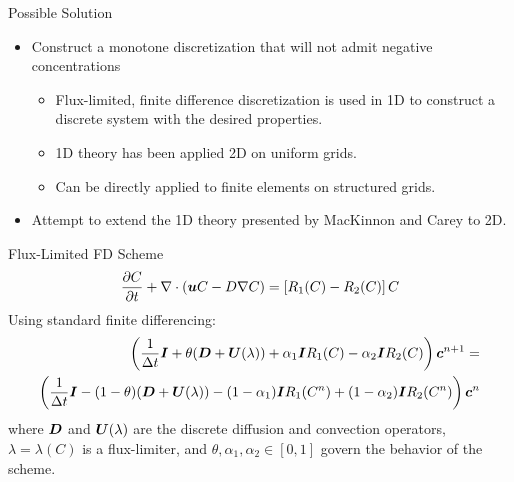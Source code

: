 \documentclass[landscape,pdftex,headrule,footrule]{foils}
\begin{document}
 
 
\begin{foil}{Possible Solution}
  \begin{itemize}
    \item Construct a monotone discretization that will not admit negative concentrations
      \begin{itemize}
        \item Flux-limited, finite difference discretization is used in 1D to
              construct a discrete system with the desired properties.
        \item 1D theory has been applied 2D on uniform grids.
        \item Can be directly applied to finite elements on
              structured grids.
      \end{itemize}
    \item Attempt to extend the 1D theory presented by MacKinnon and Carey to 2D.
  \end{itemize}
\end{foil}

                                                                                
                                                                                
\begin{foil}{Flux-Limited FD Scheme}
  \begin{equation}
    \frac{\partial C}{\partial t} + \nabla \cdot (\mbox{\boldmath $u$} C - D \nabla C)  = \left[R_1(C) - R_2(C)\right] C
    \nonumber
  \end{equation}
  Using standard finite differencing:
  \begin{eqnarray}
    \nonumber
    \left(\frac{1}{\Delta t}\mbox{\boldmath $I$} + \theta (\mbox{\boldmath $D$} + \mbox{\boldmath $U$}(\lambda)) + \alpha_1 \mbox{\boldmath $I$} R_1(C) - \alpha_2 \mbox{\boldmath $I$} R_2(C) \right) \mbox{\boldmath $c$}^{n+1} = \\ \nonumber
    \left(\frac{1}{\Delta t}\mbox{\boldmath $I$} - (1-\theta) (\mbox{\boldmath $D$} + \mbox{\boldmath $U$}(\lambda)) - (1-\alpha_1) \mbox{\boldmath $I$} R_1(C^n) + (1-\alpha_2) \mbox{\boldmath $I$} R_2(C^n) \right) \mbox{\boldmath $c$}^{n}
  \end{eqnarray}
  where $\mbox{\boldmath $D$}$ and $\mbox{\boldmath $U$}(\lambda)$ are the discrete diffusion and convection operators, $\lambda = \lambda(C)$ is a flux-limiter,
  and $\theta, \alpha_1, \alpha_2 \in [0,1]$ govern the behavior of the scheme.
                                                                                
\end{foil}
\end{document}
